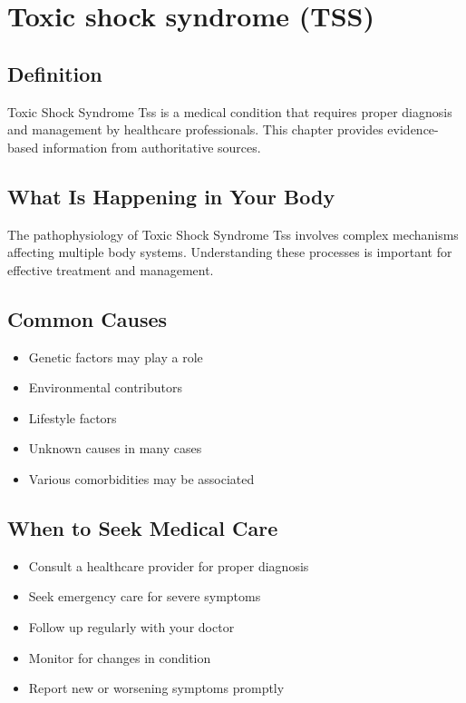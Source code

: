 
\chapter{Toxic shock syndrome (TSS)}

\section*{Definition}
Toxic Shock Syndrome Tss is a medical condition that requires proper diagnosis and management by healthcare professionals. This chapter provides evidence-based information from authoritative sources.

\section*{What Is Happening in Your Body}
The pathophysiology of Toxic Shock Syndrome Tss involves complex mechanisms affecting multiple body systems. Understanding these processes is important for effective treatment and management.

\section*{Common Causes}
\begin{itemize}
  \item Genetic factors may play a role
  \item Environmental contributors
  \item Lifestyle factors
  \item Unknown causes in many cases
  \item Various comorbidities may be associated
\end{itemize}

\section*{When to Seek Medical Care}
\begin{itemize}
  \item Consult a healthcare provider for proper diagnosis
  \item Seek emergency care for severe symptoms
  \item Follow up regularly with your doctor
  \item Monitor for changes in condition
  \item Report new or worsening symptoms promptly
\end{itemize}

